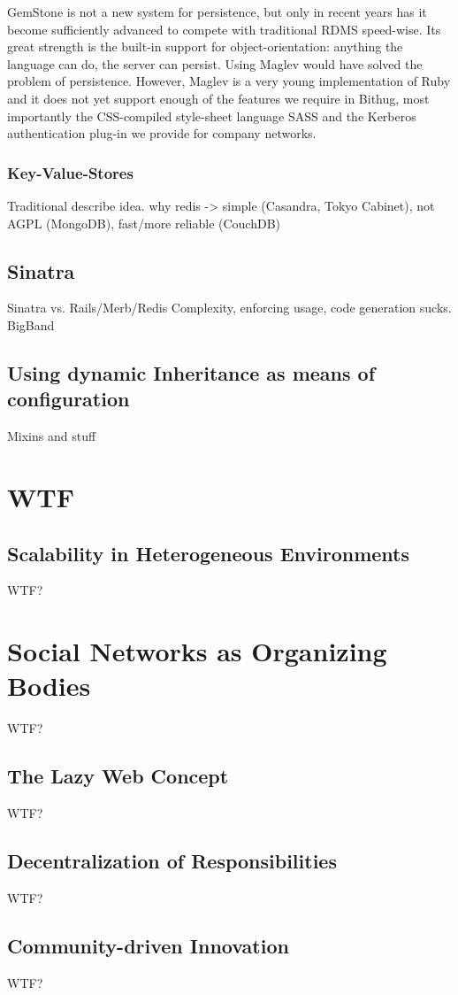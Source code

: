 \documentclass{llncs}
\begin{document}
GemStone is not a new system\cite{citation needed} for persistence, but only
in recent years has it become sufficiently advanced to compete with traditional
RDMS speed-wise. Its great strength is the built-in support for 
object-orientation: anything the language can do, the server can persist. Using
Maglev would have solved the problem of persistence. However, Maglev is a very 
young implementation of Ruby and it does not yet support enough of the features
we require in Bithug, most importantly the CSS-compiled style-sheet language 
SASS and the Kerberos authentication plug-in we provide for company networks.
\subsubsection{Key-Value-Stores}
Traditional 
describe idea.
why redis -> simple (Casandra, Tokyo Cabinet), not AGPL (MongoDB), fast/more reliable (CouchDB)

\subsection{Sinatra}
Sinatra vs. Rails/Merb/Redis
Complexity, enforcing usage, code generation sucks.
BigBand

\subsection{Using dynamic Inheritance as means of configuration}
Mixins and stuff

\section{WTF}

\subsection{Scalability in Heterogeneous Environments}
WTF?

\section{Social Networks as Organizing Bodies}
WTF?

\subsection{The Lazy Web Concept}
WTF?

\subsection{Decentralization of Responsibilities}
WTF?

\subsection{Community-driven Innovation}
WTF?
\end{document}
